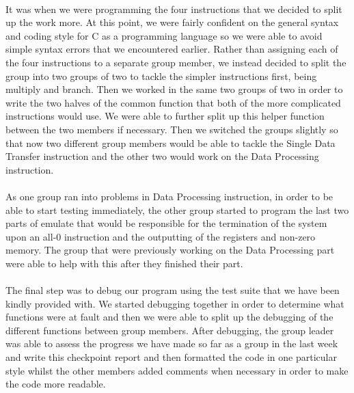 \documentclass[11pt]{article}
\begin{document}
\paragraph{}
It was when we were programming the four instructions that we decided to split up the work more. At this point, we were fairly confident on the general syntax and coding style for C as a programming language so we were able to avoid simple syntax errors that we encountered earlier.  Rather than assigning each of the four instructions to a separate group member, we instead decided to split the group into two groups of two to tackle the simpler instructions first, being multiply and branch. Then we worked in the same two groups of two in order to write the two halves of the common function that both of the more complicated instructions would use. We were able to further split up this helper function between the two members if necessary. Then we switched the groups slightly so that now two different group members would be able to tackle the Single Data Transfer instruction and the other two would work on the Data Processing instruction. 
\paragraph{}
As one group ran into problems in Data Processing instruction, in order to be able to start testing immediately, the other group started to program the last two parts of emulate that would be responsible for the termination of the system upon an all-0 instruction and the outputting of the registers and non-zero memory. The group that were previously working on the Data Processing part were able to help with this after they finished their part.
\paragraph{}
The final step was to debug our program using the test suite that we have been kindly provided with. We started debugging together in order to determine what functions were at fault and then we were able to split up the debugging of the different functions between group members. After debugging, the group leader was able to assess the progress we have made so far as a group in the last week and write this checkpoint report and then formatted the code in one particular style whilst the other members added comments when necessary in order to make the code more readable.

\end{document}
